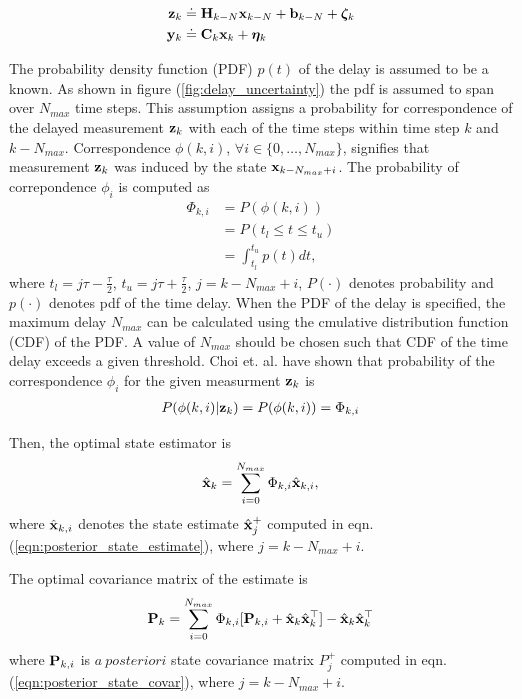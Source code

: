 \begin{align}\label{eqn:LinearDelayedMeasurement4UpdatedState}
	\mathbf{z}_k &\doteq \mathbf{H}_{k-N} \mathbf{x}_{k-N} + \mathbf{b}_{k-N} +\boldsymbol{\zeta}_k \\
	\label{eqn:LinearUndelayedMeasurement4UpdatedState}
	\mathbf{y}_k &\doteq \mathbf{C}_k \mathbf{x}_k + \boldsymbol{\eta}_k
\end{align}


The probability density function (PDF) $p(t)$ of the delay is assumed to be a known. As shown in figure (\ref{fig:delay_uncertainty}) the pdf is assumed to span over $N_{max}$ time steps. This assumption assigns a probability for correspondence of the delayed measurement $\mathbf{z}_k$ with each of the time steps within time step $k$ and $k- N_{max}$.
Correspondence $\phi(k,i)$, $\forall i \in \{0, \dots, N_{max}\}$, signifies that measurement $\mathbf{z}_k$ was induced by the state $\mathbf{x}_{k-N_{max}+i}$.
The probability of correpondence $\phi_i$ is computed as
\begin{align}
	\Phi_{k,i} &= P(\phi(k,i)) \\
	&= P(t_l \le t \le t_u) \\
	&= \int_{t_l}^{ t_u} p(t) dt,
\end{align}
where $t_l = {j\tau - \frac{\tau}{2}}$, $t_u = {j \tau + \frac{\tau}{2}}$, $j = k - N_{max} + i $, $P(\cdot)$ denotes probability and $p(\cdot)$ denotes pdf of the time delay. When the PDF of the delay is specified, the maximum delay $N_{max}$ can be calculated using the cmulative distribution function (CDF) of the PDF. 
A value of $N_{max}$ should be chosen such that CDF of the time delay exceeds a given threshold. 
Choi et. al. have shown that probability of the correspondence $\phi_i$ for the given measurment $\mathbf{z}_k$ is \cite{choi2012state}
\begin{align}
	P(\phi(k,i) | \mathbf{z}_k ) = P(\phi(k,i)) = \Phi_{k,i}
\end{align}

Then, the optimal state estimator is
\begin{align}
	\hat{\mathbf{x}}_k = \sum_{i=0}^{N_{max}} \Phi_{k,i} \hat{\mathbf{x}}_{k,i},
\end{align}
where $\hat{\mathbf{x}}_{k,i}$ denotes the state estimate $\hat{\mathbf{x}}_j^+$ computed in eqn. (\ref{eqn:posterior_state_estimate}), where $j = k - N_{max} + i$.

The optimal covariance matrix of the estimate is
\begin{align}
	\mathbf{P}_k = \sum_{i = 0}^{N_{max}} \Phi_{k,i} [\mathbf{P}_{k,i} + \hat{\mathbf{x}}_k \hat{\mathbf{x}}_k^\top] - \hat{\mathbf{x}}_k \hat{\mathbf{x}}_k^\top	
\end{align}
where $\mathbf{P}_{k,i}$ is $a~posteriori$ state covariance matrix $P_j^+$ computed in eqn. (\ref{eqn:posterior_state_covar}),  where $j = k - N_{max} + i$.



